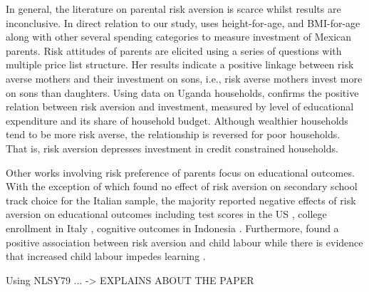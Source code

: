 \documentclass[]{article}
\begin{document}
In general, the literature on parental risk aversion is scarce whilst results are inconclusive. In direct relation to our study, \citet{sovero2018risk} uses height-for-age, and BMI-for-age along with other several spending categories to measure investment of Mexican parents. Risk attitudes of parents are elicited using a series of questions with multiple price list structure. Her results indicate a positive linkage between risk averse mothers and their investment on sons, i.e., risk averse mothers invest more on sons than daughters. Using data on Uganda households, \citet{tabetando2019parental} confirms the positive relation between risk aversion and investment, measured by level of educational expenditure and its share of household budget. Although wealthier households tend to be more risk averse, the relationship is reversed for poor households. That is, risk aversion depresses investment in credit constrained households.      

Other works involving risk preference of parents focus on educational outcomes. With the exception of \citet{leonardi2007parents} which found no effect of risk aversion on secondary school track choice for the Italian sample, the majority reported negative effects of risk aversion on educational outcomes including test scores in the US \citep{brown2012parental}, college enrollment in Italy \citep{checchi2014parents}, cognitive outcomes in Indonesia \citep{hartarto2023parental}. Furthermore, \citet{frempong2021risk} found a positive association between risk aversion and child labour while there is evidence that increased child labour impedes learning \citep{HEADY2003385, bezerra2009impact}.  

Using NLSY79 ... -> EXPLAINS ABOUT THE PAPER


\end{document}

